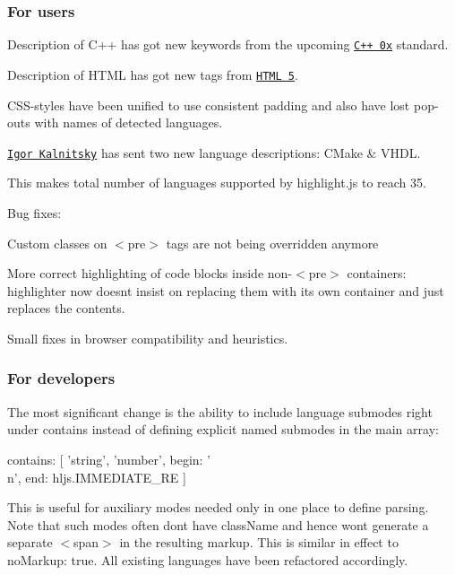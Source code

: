 \subsubsection*{For users}


\begin{DoxyItemize}
\item Description of C++ has got new keywords from the upcoming \href{http://ru.wikipedia.org/wiki/C%2B%2B0x}{\tt C++ 0x} standard.
\item Description of H\+T\+ML has got new tags from \href{http://en.wikipedia.org/wiki/HTML5}{\tt H\+T\+ML 5}.
\item C\+S\+S-\/styles have been unified to use consistent padding and also have lost pop-\/outs with names of detected languages.
\item \href{http://kalnitsky.org.ua/}{\tt Igor Kalnitsky} has sent two new language descriptions\+: C\+Make \& V\+H\+DL.
\end{DoxyItemize}

This makes total number of languages supported by highlight.\+js to reach 35.

Bug fixes\+:


\begin{DoxyItemize}
\item Custom classes on {\ttfamily $<$pre$>$} tags are not being overridden anymore
\item More correct highlighting of code blocks inside non-\/{\ttfamily $<$pre$>$} containers\+: highlighter now doesn\textquotesingle{}t insist on replacing them with its own container and just replaces the contents.
\item Small fixes in browser compatibility and heuristics.
\end{DoxyItemize}

\subsubsection*{For developers}

The most significant change is the ability to include language submodes right under {\ttfamily contains} instead of defining explicit named submodes in the main array\+: \begin{DoxyVerb}contains: [
  'string',
  'number',
  {begin: '\\n', end: hljs.IMMEDIATE_RE}
]
\end{DoxyVerb}


This is useful for auxiliary modes needed only in one place to define parsing. Note that such modes often don\textquotesingle{}t have {\ttfamily class\+Name} and hence won\textquotesingle{}t generate a separate {\ttfamily $<$span$>$} in the resulting markup. This is similar in effect to {\ttfamily no\+Markup\+: true}. All existing languages have been refactored accordingly.

